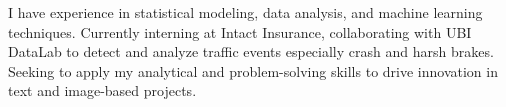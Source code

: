 
\begin{justify}


 {I have experience in statistical modeling, data analysis, and machine learning techniques. Currently interning at Intact Insurance, collaborating with UBI DataLab to detect and analyze traffic events especially crash and harsh brakes. Seeking to apply my analytical and problem-solving skills to drive innovation in text and image-based projects.}

\end{justify}



